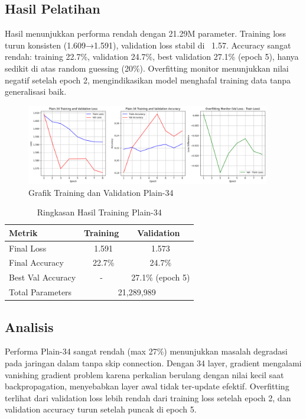 \documentclass[11pt,a4paper]{article}
\begin{document}
\subsection{Hasil Pelatihan}
Hasil menunjukkan performa rendah dengan 21.29M parameter. Training loss turun konsisten (1.609→1.591), validation loss stabil di ~1.57. Accuracy sangat rendah: training 22.7\%, validation 24.7\%, best validation 27.1\% (epoch 5), hanya sedikit di atas random guessing (20\%). Overfitting monitor menunjukkan nilai negatif setelah epoch 2, mengindikasikan model menghafal training data tanpa generalisasi baik.
\begin{figure}[h]
\centering
\includegraphics[width=0.95\textwidth]{Figure/plainnet34.png}
\caption{Grafik Training dan Validation Plain-34}
\label{fig:plain34}
\end{figure}
\begin{table}[h]
\centering
\caption{Ringkasan Hasil Training Plain-34}
\begin{tabular}{|l|c|c|}
\hline
\textbf{Metrik} & \textbf{Training} & \textbf{Validation} \\ \hline
Final Loss & ~1.591 & ~1.573 \\ \hline
Final Accuracy & ~22.7\% & ~24.7\% \\ \hline
Best Val Accuracy & - & ~27.1\% (epoch 5) \\ \hline
Total Parameters & \multicolumn{2}{c|}{21,289,989} \\ \hline
\end{tabular}
\end{table}
\subsection{Analisis}
Performa Plain-34 sangat rendah (max 27\%) menunjukkan masalah degradasi pada jaringan dalam tanpa skip connection. 
Dengan 34 layer, gradient mengalami vanishing gradient problem karena perkalian berulang dengan nilai kecil saat backpropagation, 
menyebabkan layer awal tidak ter-update efektif. Overfitting terlihat dari validation loss lebih rendah dari training loss setelah epoch 2, 
dan validation accuracy turun setelah puncak di epoch 5.
\end{document}
